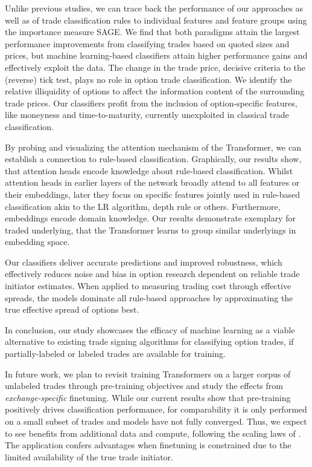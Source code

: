 Unlike previous studies, we can trace back the performance of our approaches as well as of trade classification rules to individual features and feature groups using the importance measure \gls{SAGE}. We find that both paradigms attain the largest performance improvements from classifying trades based on quoted sizes and prices, but machine learning-based classifiers attain higher performance gains and effectively exploit the data. The change in the trade price, decisive criteria to the (reverse) tick test, plays no role in option trade classification. We identify the relative illiquidity of options to affect the information content of the surrounding trade prices. Our classifiers profit from the inclusion of option-specific features, like moneyness and time-to-maturity, currently unexploited in classical trade classification.

By probing and visualizing the attention mechanism of the Transformer, we can establish a connection to rule-based classification. Graphically, our results show, that attention heads encode knowledge about rule-based classification. Whilst attention heads in earlier layers of the network broadly attend to all features or their embeddings, later they focus on specific features jointly used in rule-based classification akin to the \gls{LR} algorithm, depth rule or others. Furthermore, embeddings encode domain knowledge. Our results demonstrate exemplary for traded underlying, that the Transformer learns to group similar underlyings in embedding space.

Our classifiers deliver accurate predictions and improved robustness, which effectively reduces noise and bias in option research dependent on reliable trade initiator estimates. When applied to measuring trading cost through effective spreads, the models dominate all rule-based approaches by approximating the true effective spread of options best. 

In conclusion, our study showcases the efficacy of machine learning as a viable alternative to existing trade signing algorithms for classifying option trades, if partially-labeled or labeled trades are available for training.

In future work, we plan to revisit training Transformers on a larger corpus of unlabeled trades through pre-training objectives and study the effects from \emph{exchange-specific} finetuning. While our current results show that pre-training positively drives classification performance, for comparability it is only performed on a small subset of trades and models have not fully converged. Thus, we expect to see benefits from additional data and compute, following the scaling laws of \textcite[][7]{hoffmannTrainingComputeOptimalLarge2022}. The application confers advantages when finetuning is constrained due to the limited availability of the true trade initiator.

